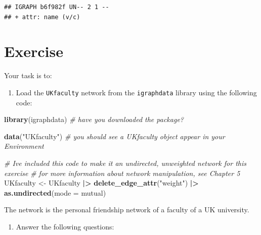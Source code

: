 \documentclass[
]{book}
\newenvironment{Shaded}{\begin{snugshade}}{\end{snugshade}}
\newcommand{\AttributeTok}[1]{\textcolor[rgb]{0.13,0.29,0.53}{#1}}
\newcommand{\CommentTok}[1]{\textcolor[rgb]{0.56,0.35,0.01}{\textit{#1}}}
\newcommand{\FunctionTok}[1]{\textcolor[rgb]{0.13,0.29,0.53}{\textbf{#1}}}
\newcommand{\NormalTok}[1]{#1}
\newcommand{\OtherTok}[1]{\textcolor[rgb]{0.56,0.35,0.01}{#1}}
\newcommand{\SpecialCharTok}[1]{\textcolor[rgb]{0.81,0.36,0.00}{\textbf{#1}}}
\newcommand{\StringTok}[1]{\textcolor[rgb]{0.31,0.60,0.02}{#1}}
\providecommand{\tightlist}{%
  \setlength{\itemsep}{0pt}\setlength{\parskip}{0pt}}
\begin{document}
\begin{verbatim}
## IGRAPH b6f982f UN-- 2 1 -- 
## + attr: name (v/c)
\end{verbatim}

\section{Exercise}\label{exercise-6}

Your task is to:

\begin{enumerate}
\def\labelenumi{\arabic{enumi}.}
\tightlist
\item
  Load the \texttt{UKfaculty} network from the \texttt{igraphdata} library using the following code:
\end{enumerate}

\begin{Shaded}
\begin{Highlighting}[]
\FunctionTok{library}\NormalTok{(igraphdata) }\CommentTok{\# have you downloaded the package? }

\FunctionTok{data}\NormalTok{(}\StringTok{"UKfaculty"}\NormalTok{) }\CommentTok{\# you should see a UKfaculty object appear in your Environment}

\CommentTok{\# I\textquotesingle{}ve included this code to make it an undirected, unweighted network for this exercise}
\CommentTok{\# for more information about network manipulation, see Chapter 5}
\NormalTok{UKfaculty }\OtherTok{\textless{}{-}}\NormalTok{ UKfaculty }\SpecialCharTok{|\textgreater{}} \FunctionTok{delete\_edge\_attr}\NormalTok{(}\StringTok{"weight"}\NormalTok{) }\SpecialCharTok{|\textgreater{}} \FunctionTok{as.undirected}\NormalTok{(}\AttributeTok{mode =} \StringTok{\textquotesingle{}mutual\textquotesingle{}}\NormalTok{)}
\end{Highlighting}
\end{Shaded}

The network is the personal friendship network of a faculty of a UK university.

\begin{enumerate}
\def\labelenumi{\arabic{enumi}.}
\setcounter{enumi}{1}
\tightlist
\item
  Answer the following questions:
\end{enumerate}
\end{document}
